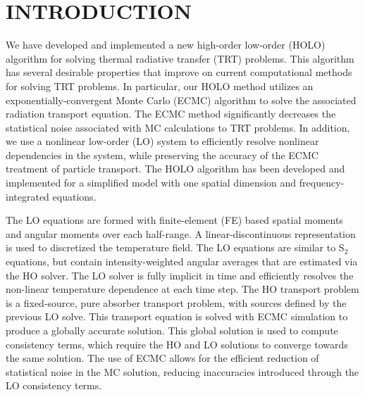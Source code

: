 %
%
%



\pagestyle{plain} %
\setcounter{page}{1}

\chapter{\uppercase {Introduction}}

We have developed and implemented a new high-order low-order (HOLO) algorithm for solving
thermal radiative transfer (TRT) problems. This algorithm has several desirable properties
that improve on current computational methods for solving TRT
problems.  In particular, our HOLO method utilizes an exponentially-convergent Monte
Carlo (ECMC) algorithm to solve the associated radiation transport equation.  The ECMC
method significantly decreases the statistical noise associated with MC calculations to
TRT problems.  In addition, we use a nonlinear low-order (LO) system to efficiently 
resolve nonlinear dependencies in the system, while preserving the accuracy of the ECMC
treatment of particle transport.  The HOLO algorithm has
been developed and implemented for a simplified model with one spatial dimension and 
frequency-integrated equations.

The LO equations are formed with finite-element (FE) based spatial
moments and angular moments over each half-range.  A linear-discontinuous representation
is used to discretized the temperature field.  The LO equations are similar to S$_2$ equations,
but contain intensity-weighted angular averages that are estimated via the HO solver.    
The LO solver is fully implicit in time and efficiently resolves the non-linear
temperature dependence at each time step.  The HO transport problem is a fixed-source,
pure absorber transport problem, with sources defined by the previous LO solve.  This
transport equation is solved with ECMC simulation to produce a globally accurate solution. 
This
global solution is used to compute consistency terms, which require the HO and LO solutions to converge towards the same solution.  The use of ECMC
allows for the efficient reduction of statistical noise in the MC solution, reducing
inaccuracies introduced through the LO consistency
terms. 

